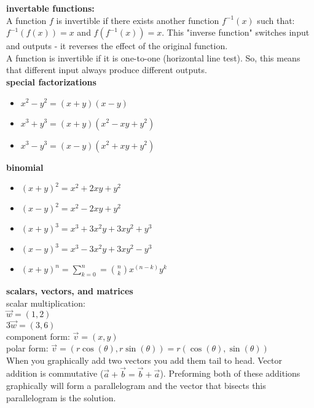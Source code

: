 \documentclass{article}
\begin{document}
\textbf{invertable functions:}\\
A function $f$ is invertible if there exists another function $f^{-1}(x)$ such that: $f^{-1}(f(x)) = x$ and $f(f^{-1}(x)) = x$. This "inverse function" switches input and outputs - it reverses the effect of the original function.\\

A function is invertible if it is one-to-one (horizontal line test). So, this means that different input always produce different outputs.\\

\textbf{special factorizations}
	\begin{itemize}
		\item $x^2 - y^2 = (x + y)(x - y)$
		\item $x^3 + y^3 = (x + y)(x^2 - xy + y^2)$
		\item $x^3 - y^3 = (x - y)(x^2 + xy + y^2)$
	\end{itemize}

\textbf{binomial}
	\begin{itemize}
		\item $(x + y)^2 = x^2 + 2xy + y^2$
		\item $(x - y)^2 = x^2 - 2xy + y^2$
		\item $(x + y)^3 = x^3 + 3x^2y + 3xy^2 + y^3$
		\item $(x - y)^3 = x^3 - 3x^2y + 3xy^2 - y^3$
		\item $(x + y)^n = \sum_{k = 0}^{n} = \binom{n}{k}x^{(n-k)}y^{k}$  
	\end{itemize}

\textbf{scalars, vectors, and matrices}\\

scalar multiplication:\\
$\vec{w} = (1 , 2)$\\
$3\vec{w} = (3, 6)$\\

component form: $\vec{v} = (x, y)$\\
polar form: $\vec{v} = (r\cos(\theta), r\sin(\theta)) = r(\cos(\theta), \sin(\theta))$\\

When you graphically add two vectors you add them tail to head. Vector addition is commutative ($\vec{a} + \vec{b} = \vec{b} + \vec{a}$). Preforming both of these additions graphically will form a parallelogram and the vector that bisects this parallelogram is the solution.\\ 
\end{document}
